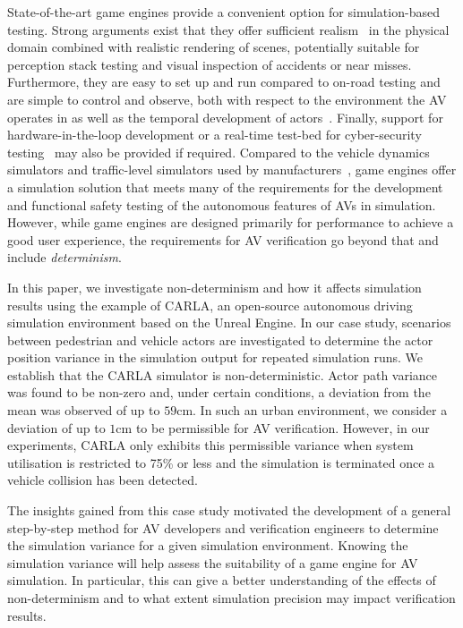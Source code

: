 State-of-the-art game engines provide a convenient option for simulation-based testing. Strong arguments exist that they offer sufficient realism~\cite{Koopman2018} in the physical domain combined with realistic rendering of scenes, potentially suitable for perception stack testing and visual inspection of accidents or near misses. 
%
Furthermore, they are easy to set up and run compared to on-road testing and are simple to control and observe, both with respect to the environment the AV operates in as well as the temporal development of actors~\cite{Ulbrich2015}. 
%
Finally, support for hardware-in-the-loop development or a real-time test-bed for cyber-security testing~\cite{Javaid2013} may also be provided if required. 
%
Compared to the vehicle dynamics simulators and traffic-level simulators used by manufacturers~\cite{FrameworkAndChallenges}, game engines offer a simulation solution that meets many of the requirements for the development and functional safety testing of the autonomous features of AVs in simulation. 
%
However, while game engines are designed primarily for performance to achieve a good user experience, the requirements for AV verification go beyond that and include \textit{determinism}.

In this paper, we investigate non-determinism and how it affects simulation results using the example of CARLA, an open-source autonomous driving simulation environment based on the Unreal Engine.
%
In our case study, scenarios between pedestrian and vehicle actors are investigated to determine the actor position variance in the simulation output for repeated simulation runs. 
%
We establish that the CARLA simulator is non-deterministic.  Actor path variance was found to be non-zero and, under certain conditions, a deviation from the mean was observed of up to $59$cm.
%
In such an urban environment, we consider a deviation of up to $1$cm to be permissible for AV verification.
%
However, in our experiments, CARLA only exhibits this permissible variance when system utilisation is restricted to 75\% or less and the simulation is terminated once a vehicle collision has been detected.

The insights gained from this case study motivated the development of a general step-by-step method for AV developers and verification engineers to determine the simulation variance for a given simulation environment. 
%
Knowing the simulation variance will help assess the suitability of a game engine for AV simulation. In particular, this can give a better understanding of the effects of non-determinism and to what extent simulation precision may impact verification results.
%

